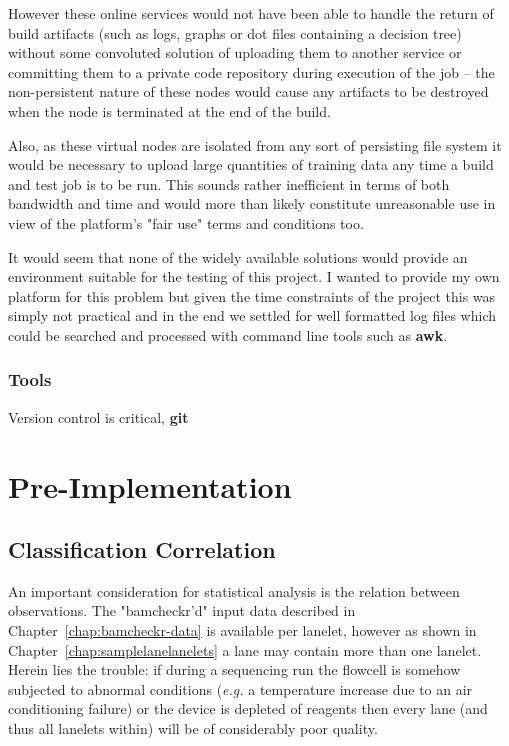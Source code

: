 However these online services would not have been able to handle the return of
build artifacts (such as logs, graphs or dot files containing a decision tree)
without some convoluted solution of uploading them to another service or
committing them to a private code repository during execution of the job -- the
non-persistent nature of these nodes would cause any artifacts to be destroyed
when the node is terminated at the end of the build.

Also, as these virtual nodes are isolated from any sort of persisting file
system it would be necessary to upload large quantities of training data any
time a build and test job is to be run. This sounds rather inefficient in terms
of both bandwidth and time and would more than likely constitute unreasonable
use in view of the platform's "fair use" terms and conditions too.

It would seem that none of the widely available solutions would provide an
environment suitable for the testing of this project. I wanted to provide my
own platform for this problem but given the time constraints of the project this
was simply not practical and in the end we settled for well formatted log files
which could be searched and processed with command line tools such as
\textbf{awk}.


\subsection{Tools}
\label{part1:dev:tools}

Version control is critical, \textbf{git}


\chapter{Pre-Implementation}
\section{Classification Correlation}

An important consideration for statistical analysis is the relation between
observations. The "bamcheckr'd" input data described in
Chapter~\ref{chap:bamcheckr-data} is available per lanelet, however as shown in
Chapter~\ref{chap:samplelanelanelets} a lane may contain more than one lanelet.
Herein lies the trouble: if during a sequencing run the flowcell is somehow
subjected to abnormal conditions (\textit{e.g.} a temperature increase due to an air
conditioning failure) or the device is depleted of reagents then every lane (and
thus all lanelets within) will be of considerably poor quality.

